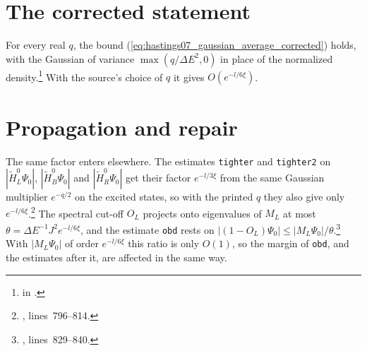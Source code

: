 \documentclass{article}
\begin{document}
\section{The corrected statement}

For every real $q$, the bound (\ref{eq:hastings07_gaussian_average_corrected})
holds, with the Gaussian of variance $\max(q/\Delta E^2,0)$ in place of the
normalized density.\footnote{
    in .}
With the source's choice of $q$ it gives $O(e^{-l/6\xi})$.

\section{Propagation and repair}

The same factor enters elsewhere. The estimates \texttt{tighter} and
\texttt{tighter2} on $|\tilde H^0_L\Psi_0|$, $|\tilde H^0_B\Psi_0|$ and
$|\tilde H^0_R\Psi_0|$ get their factor $e^{-l/3\xi}$ from the same Gaussian
multiplier $e^{-q/2}$ on the excited states, so with the printed $q$ they also
give only $e^{-l/6\xi}$.\footnote{,
    lines~796--814.}
The spectral cut-off $O_L$ projects onto eigenvalues of $M_L$ at most
$\theta=\Delta E^{-1}J^2e^{-l/6\xi}$, and the estimate \texttt{obd} rests on
$|(1-O_L)\Psi_0|\le|M_L\Psi_0|/\theta$.\footnote{,
    lines~829--840.}
With $|M_L\Psi_0|$ of order $e^{-l/6\xi}$ this ratio is only $O(1)$, so the
margin of \texttt{obd}, and the estimates after it, are affected in the same
way.
\end{document}
